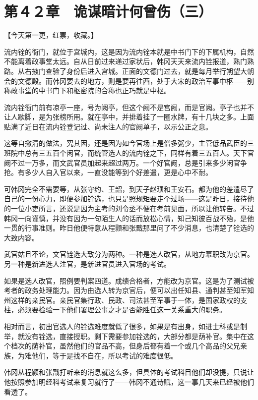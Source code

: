\section{第４２章　诡谋暗计何曾伤（三）}

【今天第一更，红票，收藏。】

流内铨的衙门，就位于宫城内，这是因为流内铨本就是中书门下的下属机构，自然不能离着政事堂太远。自从日前过来递过家状后，韩冈天天来流内铨报道，熟门熟路。从右掖门查验了身份后进入宫城。正面的文德门过去，就是每月举行朔望大朝会的文德殿。而韩冈要去的地方，则是要再往西，处于大宋的政治军事中枢——别称政事堂的中书门下和枢密院的合称也正巧就是中枢。

流内铨衙门前有凉亭一座，号为阙亭，但这个阙不是宫阙，而是官阙。亭子也并不让人歇脚，是为张榜所用。就在亭中，并排着挂了一圈水牌，有十几块之多。上面贴满了近日在流内铨登记过、尚未注人的官阙单子，以示公正之意。

这等自撇清的做法，究其因，还是因为如今官场上是僧多粥少，主管低品武臣的三班院中总有三五百个闲官，而统管选人的流内铨之下，同样有着三五百人。天下官阙不过一万多，而文武官员加起来超过两万。一个好官阙，总是引来多少闲官争抢。有多少人自入官以来，一直没能等到个好差遣，更是心中不耐。

可韩冈完全不需要等，从张守约、王韶，到天子赵顼和王安石。都为他的差遣尽了自己的一份心力，即便参加铨选，也只是照规矩要走个过场——这是昨日，接待他的一位小吏所言，还说是因为主考的刘令丞不便在考前见面，所以让他转告。不过韩冈一向谨慎，并没有因为一句陌生人的话而放松心情，知己知彼百战不殆，是他一贯的行事准则。昨日他便特意从程颢和张戬那里问了不少消息，也清楚了铨选的大致内容。

武官姑且不论，文官铨选大致分为两种。一种是选人改官，从地方幕职改为京官。另一种是新进选人注官，是新进官员进入官场的考试。

如果是选人改官，照例要判案四道。成绩合格者，方能改为京官。这是为了测试被考者的政务处理能力。因为由选人转为京官后，便可以出任知县、通判甚至知军知州这样的亲民官。亲民官集行政、民政、司法甚至军事于一体，是国家政权的支柱，必须要检验一下他们署理公事之才是否能胜任这一关系重大的职务。

相对而言，初出官选人的铨选难度就低了很多，如果是有出身，如进士科或是制举，就没有铨选，直接授职。剩下需要参加铨选的，大部分都是荫补官。集中在这个档次的荫补官，虽然他们的官品不高，但身后都有着一个或几个高品的父兄亲族，为难他们，等于是找不自在，所以考试的难度很低。

韩冈从程颢和张戬打听来的消息就这么多，但具体的考试科目他们却没提，只说让他按照参加明经科考试来复习就行了——韩冈不通诗赋，这一事几天来已经被他们看透了。

